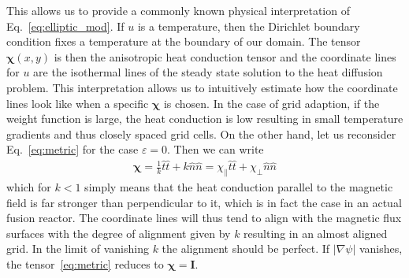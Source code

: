 \documentclass{hitec} %
\newcommand{\eps}{\varepsilon}
\renewcommand{\vec}[1]{{\mathbf{#1}}}
\begin{document}
This allows us to provide a commonly known physical interpretation of Eq.~\eqref{eq:elliptic_mod}.
If $u$ is a temperature, then the Dirichlet boundary condition 
fixes a temperature at the boundary of our domain. The tensor $\vec \chi(x,y)$ is 
then the anisotropic heat conduction tensor and the coordinate lines for $u$ are 
the isothermal lines of the steady state solution to the heat diffusion problem. 
This interpretation allows us to intuitively estimate how the
coordinate lines look like when a specific $\vec\chi$ is chosen. 
In the case of grid adaption, if the weight function is large, the heat conduction 
is low resulting in small temperature gradients and thus closely spaced grid cells. 
On the other hand, let us reconsider Eq.~\eqref{eq:metric} for the case $\eps=0$. 
Then we can write 
\begin{align}
\vec \chi = \frac{1}{k}\hat t\hat t + k \hat n\hat n 
= \chi_\parallel \hat t \hat t + \chi_\perp \hat n \hat n
  \label{eq:heat_conduction}
\end{align}
which for $k<1$ simply means that the heat conduction parallel to the magnetic field
is far stronger than perpendicular to it, which is in fact the case in an actual 
fusion reactor. 
The coordinate lines will thus tend to align with the magnetic flux
surfaces with the degree of alignment given by $k$ resulting 
in an almost aligned grid. 
In the limit of vanishing $k$ the alignment should be perfect. 
If $|\nabla\psi|$ vanishes, the tensor~\eqref{eq:metric} reduces to $\vec \chi = \vec I$.
\end{document}
